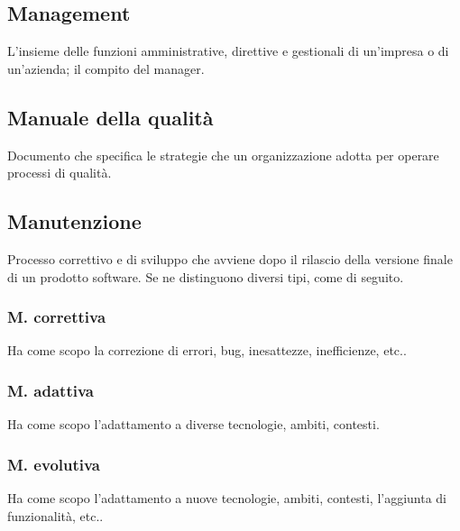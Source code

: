 
	\subsection{Management}
	\label{sec:management}
	L'insieme delle funzioni amministrative, direttive e gestionali di un'impresa o di un'azienda; il compito del manager.

	\subsection{Manuale della qualità}
	\label{sec:manualequalita}
	Documento che specifica le strategie che un organizzazione adotta per operare processi di qualità.


	\subsection{Manutenzione}
	\label{sec:manutenzione}
	Processo correttivo e di sviluppo che avviene dopo il rilascio della versione finale di un prodotto software. Se ne distinguono diversi tipi, come di seguito.

		\subsubsection{M. correttiva}
		Ha come scopo la correzione di errori, bug, inesattezze, inefficienze, etc..

		\subsubsection{M. adattiva}
		Ha come scopo l'adattamento a diverse tecnologie, ambiti, contesti.

		\subsubsection{M. evolutiva}
		Ha come scopo l'adattamento a nuove tecnologie, ambiti, contesti, l'aggiunta di funzionalità, etc..

